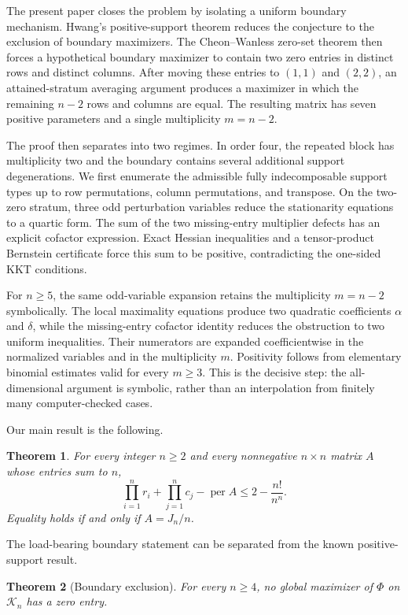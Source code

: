 \documentclass[10pt,a4paper]{amsart}
\newtheorem{theorem}{Theorem}[section]
\theoremstyle{definition}
\theoremstyle{remark}
\begin{document}
The present paper closes the problem by isolating a uniform boundary
mechanism.  Hwang's positive-support theorem reduces the conjecture to the
exclusion of boundary maximizers.  The Cheon--Wanless zero-set theorem then
forces a hypothetical boundary maximizer to contain two zero entries in
distinct rows and distinct columns.  After moving these entries to
\((1,1)\) and \((2,2)\), an attained-stratum averaging argument produces a
maximizer in which the remaining \(n-2\) rows and columns are equal.  The
resulting matrix has seven positive parameters and a single multiplicity
\(m=n-2\).

The proof then separates into two regimes.  In order four, the repeated
block has multiplicity two and the boundary contains several additional
support degenerations.  We first enumerate the admissible fully
indecomposable support types up to row permutations, column permutations,
and transpose.  On the two-zero stratum, three odd perturbation variables
reduce the stationarity equations to a quartic form.  The sum of the two
missing-entry multiplier defects has an explicit cofactor expression.
Exact Hessian inequalities and a tensor-product Bernstein certificate
force this sum to be positive, contradicting the one-sided KKT conditions.

For \(n\geq5\), the same odd-variable expansion retains the multiplicity
\(m=n-2\) symbolically.  The local maximality equations produce two
quadratic coefficients \(\alpha\) and \(\delta\), while the missing-entry
cofactor identity reduces the obstruction to two uniform inequalities.
Their numerators are expanded coefficientwise in the normalized variables
and in the multiplicity \(m\).  Positivity follows from elementary
binomial estimates valid for every \(m\geq3\).  This is the decisive step:
the all-dimensional argument is symbolic, rather than an interpolation
from finitely many computer-checked cases.

Our main result is the following.


\begin{theorem}\label{thm:dittert}
For every integer \(n\geq2\) and every nonnegative \(n\times n\) matrix
\(A\) whose entries sum to \(n\),
\[
 \prod_{i=1}^n r_i+\prod_{j=1}^n c_j-
 \operatorname{per}A
 \leq 2-\frac{n!}{n^n}.
\]
Equality holds if and only if \(A=J_n/n\).
\end{theorem}


The load-bearing boundary statement can be separated from the known
positive-support result.

\begin{theorem}[Boundary exclusion]\label{thm:boundary-exclusion}
For every \(n\geq4\), no global maximizer of \(\Phi\) on \(\mathcal K_n\)
has a zero entry.
\end{theorem}
\end{document}
